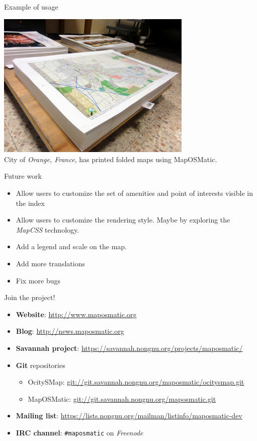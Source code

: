 \documentclass{beamer}
\begin{document}
\begin{frame}{Example of usage}
  \begin{center}
    \includegraphics[width=0.7\textwidth]{orange-city.jpg}\\
    City of {\em Orange, France}, has printed folded maps using
    MapOSMatic.
  \end{center}
\end{frame}

\begin{frame}{Future work}
  \begin{itemize}
  \item Allow users to customize the set of amenities and point of
    interests visible in the index
  \item Allow users to customize the rendering style. Maybe by
    exploring the {\em MapCSS} technology.
  \item Add a legend and scale on the map.
  \item Add more translations
  \item Fix more bugs
  \end{itemize}
\end{frame}

\begin{frame}{Join the project!}
  \begin{itemize}
  \item {\bf Website}: \url{http://www.maposmatic.org}
  \item {\bf Blog}: \url{http://news.maposmatic.org}
  \item {\bf Savannah project}: \url{https://savannah.nongnu.org/projects/maposmatic/}
  \item {\bf Git} repositories
    \begin{itemize}
      \scriptsize
    \item OcitySMap: \url{git://git.savannah.nongnu.org/maposmatic/ocitysmap.git}
    \item MapOSMatic: \url{git://git.savannah.nongnu.org/maposmatic.git}
    \end{itemize}
  \item {\bf Mailing list}: \url{https://lists.nongnu.org/mailman/listinfo/maposmatic-dev}
  \item {\bf IRC channel}: {\tt \#maposmatic} on {\em Freenode}
  \end{itemize}
\end{frame}
\end{document}
